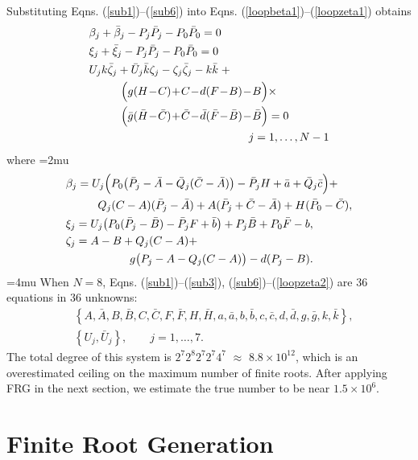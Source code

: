 \documentclass[journal]{IEEEtran}
\def\*#1{\bar{#1}} %
\begin{document}
Substituting Eqns. (\ref{sub1})--(\ref{sub6}) into Eqns. (\ref{loopbeta1})--(\ref{loopzeta1}) obtains
\begin{align}
&\beta_j + \*\beta_j - P_j\*P_j - P_0\*P_0 = 0 \\
&\xi_j + \*\xi_j - P_j\*P_j - P_0\*P_0 = 0 \\
&U_jk\*\zeta_j + \*U_j\*k\zeta_j - \zeta_j\*\zeta_j - k\*k \; + \nonumber\\ 
&\hspace{10mm} \Big(g(H\!-\!C)\!+\!C\!-\!d(F\!-\!B)\!-\!B\Big) \times \nonumber\\
&\hspace{10mm} \Big(\*g(\*H\!-\!\*C)\!+\!\*C\!-\!\*d(\*F\!-\!\*B)\!-\!\*B\Big) = 0 \\
&\hspace{50mm} j=1,\ldots,N-1 \nonumber
\end{align}
where
\medmuskip=2mu
\begin{align}
&\beta_j = U_j \Big(P_0 \big(\*P_j-\*A-\*Q_j(\*C-\*A)\big) - \*P_jH+\*a+\*Q_j\*c\Big) + \nonumber\\
&\hspace{10mm} Q_j(C-A)(\*P_j-\*A) + A(\*P_j+\*C-\*A) + H(\*P_0-\*C), \nonumber\\
&\xi_j = U_j \big(P_0(\*P_j-\*B) - \*P_jF + \*b\big) + P_j\*B + P_0\*F - b, \nonumber\\
&\zeta_j = A-B+Q_j(C-A) + \nonumber\\
&\hspace{20mm} g\big(P_j-A-Q_j(C-A)\big) - d(P_j-B). \label{loopzeta2}
\end{align}
\medmuskip=4mu
When $N=8$, Eqns. (\ref{sub1})--(\ref{sub3}), (\ref{sub6})--(\ref{loopzeta2}) are 36 equations in 36 unknowns:
\begin{align}
&\left\lbrace A, \*A, B, \*B, C, \*C, F, \*F, H, \*H, a, \*a, b, \*b, c, \*c, d, \*d, g, \*g, k, \*k \right\rbrace, \nonumber\\
&\left\lbrace U_j, \*U_j \right\rbrace, \qquad j=1,\ldots,7.
\end{align}
The total degree of this system is $2^7 2^8 2^7 2^7 4^7$ $\approx$ $8.8\!\times\!10^{12}$, which is an overestimated ceiling on the maximum number of finite roots.  After applying FRG in the next section, we estimate the true number to be near $1.5\!\times\!10^{6}$.


\section{Finite Root Generation}
\label{sec:frg}
\end{document}
